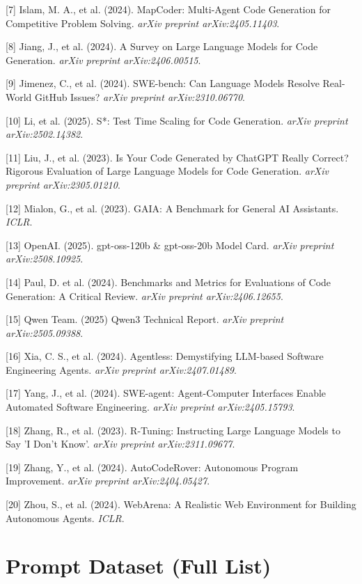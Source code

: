 \documentclass{article}
\begin{document}
[7] Islam, M. A., et al. (2024). MapCoder: Multi-Agent Code Generation for Competitive Problem Solving. \textit{arXiv preprint arXiv:2405.11403}.

[8] Jiang, J., et al. (2024). A Survey on Large Language Models for Code Generation. \textit{arXiv preprint arXiv:2406.00515}.

[9] Jimenez, C., et al. (2024). SWE-bench: Can Language Models Resolve Real-World GitHub Issues? \textit{arXiv preprint arXiv:2310.06770}.

[10] Li, et al. (2025). S*: Test Time Scaling for Code Generation. \textit{arXiv preprint arXiv:2502.14382}.

[11] Liu, J., et al. (2023). Is Your Code Generated by ChatGPT Really Correct? Rigorous Evaluation of Large Language Models for Code Generation. \textit{arXiv preprint arXiv:2305.01210}.

[12] Mialon, G., et al. (2023). GAIA: A Benchmark for General AI Assistants. \textit{ICLR}.

[13] OpenAI. (2025). gpt-oss-120b \& gpt-oss-20b Model Card. \textit{arXiv preprint arXiv:2508.10925}.

[14] Paul, D. et al. (2024). Benchmarks and Metrics for Evaluations of Code Generation: A Critical Review. \textit{arXiv preprint arXiv:2406.12655}.

[15] Qwen Team. (2025) Qwen3 Technical Report. \textit{arXiv preprint arXiv:2505.09388}.

[16] Xia, C. S., et al. (2024). Agentless: Demystifying LLM-based Software Engineering Agents. \textit{arXiv preprint arXiv:2407.01489}.

[17] Yang, J., et al. (2024). SWE-agent: Agent-Computer Interfaces Enable Automated Software Engineering. \textit{arXiv preprint arXiv:2405.15793}.

[18] Zhang, R., et al. (2023). R-Tuning: Instructing Large Language Models to Say 'I Don't Know'. \textit{arXiv preprint arXiv:2311.09677}.

[19] Zhang, Y., et al. (2024). AutoCodeRover: Autonomous Program Improvement. \textit{arXiv preprint arXiv:2404.05427}.

[20] Zhou, S., et al. (2024). WebArena: A Realistic Web Environment for Building Autonomous Agents. \textit{ICLR}.


\appendix

\section{Prompt Dataset (Full List)}
\label{sec:prompt-dataset}
\end{document}
